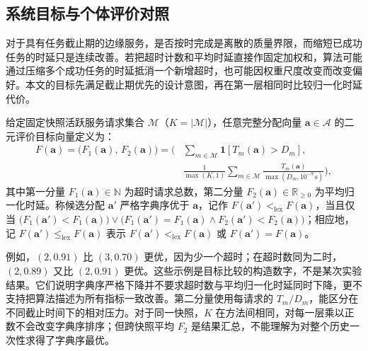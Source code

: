 \subsection{系统目标与个体评价对照}
\label{sec:lex-objective}
\label{sec:four-methods}

对于具有任务截止期的边缘服务，是否按时完成是离散的质量界限，而缩短已成功任务的时延只是连续改善。若把超时计数和平均时延直接作固定加权和，算法可能通过压缩多个成功任务的时延抵消一个新增超时，也可能因权重尺度改变而改变偏好\cite{marler2004survey}。本文的目标先满足截止期优先的设计意图，再在第一层相同时比较归一化时延代价。

\begin{definition}[固定快照严格二元字典序优序关系]
给定固定快照活跃服务请求集合 $\mathcal{M}$（$K=|\mathcal{M}|$），任意完整分配向量 $\mathbf{a}\in\mathcal{A}$ 的二元评价目标向量定义为：
\begin{equation}
 \begin{aligned}
 F(\mathbf a)=\big(F_1(\mathbf a),\,F_2(\mathbf a)\big)=\bigg(&\sum_{m\in\mathcal M}\mathbf1[T_m(\mathbf a)>D_m],\\
 &\frac{1}{\max(K,1)}\sum_{m\in\mathcal M}
                 \frac{T_m(\mathbf a)}{\max(D_m,10^{-9}\,\mathrm s)}\bigg),
 \end{aligned}
 \label{eq:chapter4-lex-objective}
\end{equation}
其中第一分量 $F_1(\mathbf{a})\in\mathbb{N}$ 为超时请求总数，第二分量 $F_2(\mathbf{a})\in\mathbb{R}_{\geq 0}$ 为平均归一化时延。称候选分配 $\mathbf{a}'$ 严格字典序优于 $\mathbf{a}$，记作 $F(\mathbf{a}')<_{\mathrm{lex}}F(\mathbf{a})$，当且仅当 $\big(F_1(\mathbf{a}')<F_1(\mathbf{a})\big)\lor\allowbreak\big(F_1(\mathbf{a}')=F_1(\mathbf{a})\land F_2(\mathbf{a}')<F_2(\mathbf{a})\big)$；相应地，记 $F(\mathbf{a}')\leq_{\mathrm{lex}}F(\mathbf{a})$ 表示 $F(\mathbf{a}')<_{\mathrm{lex}}F(\mathbf{a})$ 或 $F(\mathbf{a}')=F(\mathbf{a})$。
\end{definition}

例如，$(2,0.91)$ 比 $(3,0.70)$ 更优，因为少一个超时；在超时数同为二时，$(2,0.89)$ 又比 $(2,0.91)$ 更优。这些示例是目标比较的构造数字，不是某次实验结果。它们说明字典序严格下降并不要求超时数与平均归一化时延同时下降，更不支持把算法描述为所有指标一致改善。第二分量使用每请求的 $T_m/D_m$，能区分在不同截止时间下的相对压力。对于同一快照，$K$ 在方法间相同，对每一层乘以正数不会改变字典序排序；但跨快照平均 $F_2$ 是结果汇总，不能理解为对整个历史一次性求得了字典序最优。

